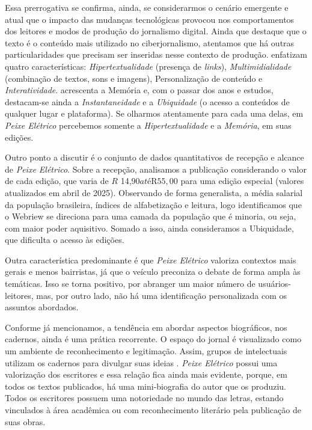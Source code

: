 \documentclass[portuguese]{textolivre}
\begin{document}
Essa prerrogativa se confirma, ainda, se considerarmos o cenário emergente e atual que o impacto das mudanças tecnológicas provocou nos comportamentos dos leitores e modos de produção do jornalismo digital. Ainda que \textcite{canavilhas2011} destaque que o texto é o conteúdo mais utilizado no ciberjornalismo, atentamos que há outras particularidades que precisam ser inseridas nesse contexto de produção. \textcite{bardoel_deuze} enfatizam quatro características: \textit{Hipertextualidade} (presença de \textit{links}), \textit{Multimidialidade} (combinação de textos, sons e imagens), Personalização de conteúdo e \textit{Interatividade}. \textcite{palacios1999} acrescenta a Memória e, com o passar dos anos e estudos, destacam-se ainda a \textit{Instantaneidade} e a \textit{Ubiquidade} (o acesso a conteúdos de qualquer lugar e plataforma). Se olharmos atentamente para cada uma delas, em \textit{Peixe Elétrico} percebemos somente a \textit{Hipertextualidade} e a \textit{Memória}, em suas edições.

Outro ponto a discutir é o conjunto de dados quantitativos de recepção e alcance de \textit{Peixe Elétrico}. Sobre a recepção, analisamos a publicação considerando o valor de cada edição, que varia de $R$ 14,90$ até $R$ 55,00$ para uma edição especial (valores atualizados em abril de 2025). Observando de forma generalista, a média salarial da população brasileira, índices de alfabetização e leitura, logo identificamos que o Webriew se direciona para uma camada da população que é minoria, ou seja, com maior poder aquisitivo. Somado a isso, ainda consideramos a Ubiquidade, que dificulta o acesso às edições.

Outra característica predominante é que \textit{Peixe Elétrico} valoriza contextos mais gerais e menos bairristas, já que o veículo preconiza o debate de forma ampla às temáticas. Isso se torna positivo, por abranger um maior número de usuários-leitores, mas, por outro lado, não há uma identificação personalizada com os assuntos abordados.

Conforme já mencionamos, a tendência em abordar aspectos biográficos, nos cadernos, ainda é uma prática recorrente. O espaço do jornal é visualizado como um ambiente de reconhecimento e legitimação. Assim, grupos de intelectuais utilizam os cadernos para divulgar suas ideias \cite{lima2013}. \textit{Peixe Elétrico} possui uma valorização dos escritores e essa relação fica ainda mais evidente, porque, em todos os textos publicados, há uma mini-biografia do autor que os produziu. Todos os escritores possuem uma notoriedade no mundo das letras, estando vinculados à área acadêmica ou com reconhecimento literário pela publicação de suas obras.
\end{document}
